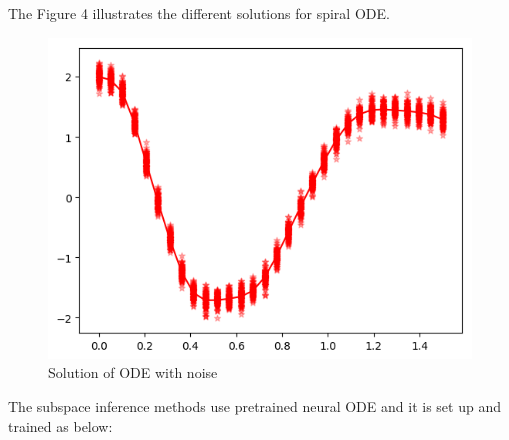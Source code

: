 \documentclass[12pt,a4paper]{article}
\begin{document}
The Figure 4 illustrates  the different solutions for spiral ODE.

\begin{figure}
\centering
\includegraphics{img/ode_noise.png}
\caption{Solution of ODE with noise}
\end{figure}


The subspace inference methods use pretrained neural ODE and it is set up and trained as below:
\end{document}
